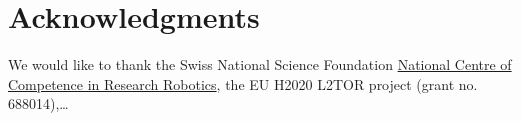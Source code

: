 \documentclass{sig-alternate-05-2015}
\begin{document}
\section{Acknowledgments}
We would like to thank the Swiss National Science Foundation 
\href{http://www.nccr-robotics.ch/}{National Centre of Competence in Research 
Robotics}, the EU H2020 L2TOR project (grant no. 688014),\dots


  
\end{document}
